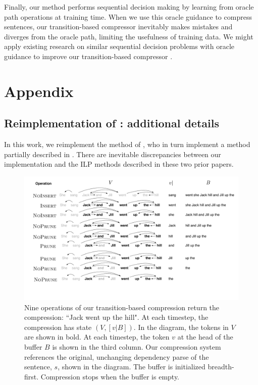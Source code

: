 \documentclass[11pt,a4paper]{article}
\begin{document}
Finally, our method performs sequential decision making by learning from oracle path operations at training time. When we use this oracle guidance to compress sentences, our transition-based compressor inevitably makes mistakes and diverges from the oracle path, limiting the usefulness of training data. We might apply existing research on similar sequential decision problems with oracle guidance to improve our transition-based compressor \cite{Ross2011ARO}. 

\section{Appendix}

\subsection{Reimplementation of \citet{filippova2013overcoming}: additional details}

In this work, we reimplement the method of \citet{filippova2013overcoming}, who in turn implement a method partially described in \citet{filippova2008dependency}.  There are inevitable discrepancies between our implementation and the ILP methods described in these two prior papers.  

\begin{figure}[htb!]
\centering
\includegraphics[width=.75\textwidth]{worked.pdf}
\caption{Nine operations of our transition-based compression return the compression: ``Jack went up the hill". At each timestep, the compression has state $(V, [v|B])$. In the diagram, the tokens in $V$ are shown in bold. At each timestep, the token $v$ at the head of the buffer $B$ is shown in the third column. Our compression system references the original, unchanging dependency parse of the sentence, $s$, shown in the diagram. The buffer is initialized breadth-first. Compression stops when the buffer is empty.}
\label{f:example}
\end{figure}
\end{document}
